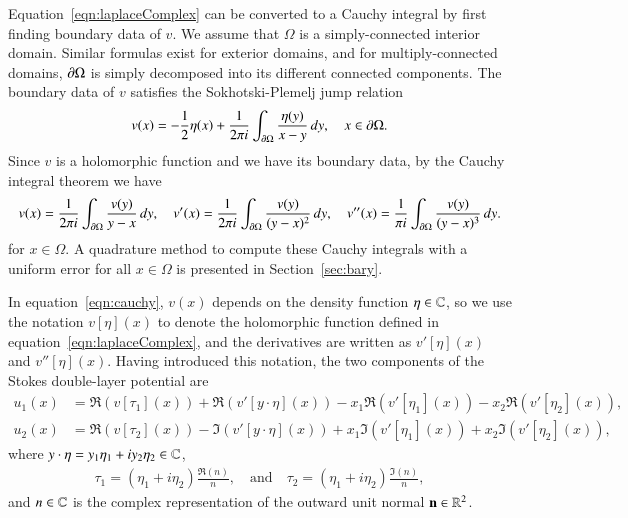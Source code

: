 \documentclass[preprint, 10pt]{elsarticle}
\begin{document}
Equation~\eqref{eqn:laplaceComplex} can be converted to a Cauchy
integral by first finding boundary data of $v$.  We assume that $\Omega$
is a simply-connected interior domain.  Similar formulas exist for
exterior domains, and for multiply-connected domains, ${\partial}\Omega$ is
simply decomposed into its different connected components.  The boundary
data of $v$ satisfies the Sokhotski-Plemelj jump relation
\begin{align}
  \label{eqn:SPrelation}
  v(x) = - \frac{1}{2} \eta(x) + \frac{1}{2\pi i} \int_{{\partial}\Omega}
    \frac{\eta(y)}{x-y}\, dy, \quad x \in {\partial}\Omega.
\end{align}
Since $v$ is a holomorphic function and we have its boundary data, by
the Cauchy integral theorem we have
\begin{align}
  \label{eqn:cauchy}
  v(x) = \frac{1}{2\pi i}\int_{{\partial}\Omega} 
    \frac{v(y)}{y-x} \,dy, \quad
  v'(x) = \frac{1}{2\pi i} \int_{{\partial}\Omega}
    \frac{v(y)}{(y-x)^2} \, dy, \quad
  v''(x) = \frac{1}{\pi i} \int_{{\partial}\Omega}
    \frac{v(y)}{(y-x)^3} \, dy.
\end{align}
for $x \in \Omega$.  A quadrature method to compute these Cauchy
integrals with a uniform error for all $x \in \Omega$ is presented in
Section~\ref{sec:bary}.
  
  
In equation~\eqref{eqn:cauchy}, $v(x)$ depends on the density function
$\eta \in {\mathbb{C}}$, so we use the notation $v[\eta](x)$ to denote the
holomorphic function defined in equation~\eqref{eqn:laplaceComplex}, and
the derivatives are written as $v'[\eta](x)$ and $v''[\eta](x)$.  Having
introduced this notation, the two components of the Stokes double-layer
potential are~\cite{bar-wu-vee2015}
\begin{equation}
  \begin{aligned}
    u_1(x) &= \Re (v[\tau_1](x)) + \Re (v'[y\cdot\eta](x)) 
             -x_1\Re (v'[\eta_1](x)) - x_2\Re (v'[\eta_2](x)), \\
    u_2(x) &= \Re (v[\tau_2](x)) - \Im (v'[y\cdot\eta](x)) 
         +x_1\Im (v'[\eta_1](x)) + x_2\Im (v'[\eta_2](x)),
  \end{aligned}
  \label{eqn:cauchyVelocity}
\end{equation}
where $y \cdot \eta = y_1 \eta_1 + i y_2 \eta_2 \in {\mathbb{C}}$, 
\begin{align} 
  \tau_1=(\eta_1+i\eta_2)\frac{\Re(n)}{n}, \quad \text{and} \quad
  \tau_2=(\eta_1+i\eta_2)\frac{\Im(n)}{n},
\end{align}
and $n \in {\mathbb{C}}$ is the complex representation of the outward unit normal
${\mathbf{n}} \in {\mathbb{R}}^2$.
\end{document}
